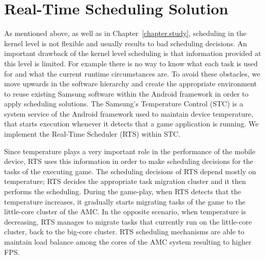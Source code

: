 \section{Real-Time Scheduling Solution}

As mentioned above, as well as in Chapter~\ref{chapter.study}, scheduling in the kernel level is not flexible and usually results to bad scheduling decisions.
An important drawback of the kernel level scheduling is that information provided at this level is limited. 
For example there is no way to know what each task is used for and what the current runtime circumstances are. 
To avoid these obstacles, we move upwards in the software hierarchy and create the appropriate environment to reuse existing Samsung software within the Android framework in order to apply scheduling solutions. 
The Samsung’s Temperature Control (STC) is a system service of the Android framework used to maintain device temperature, that starts execution whenever it detects that a game application is running.
We implement the Real-Time Scheduler (RTS) within STC.

Since temperature plays a very important role in the performance of the mobile device, RTS uses this information in order to make scheduling decisions for the tasks of the executing game.
The scheduling decisions of RTS depend mostly on temperature; RTS decides the appropriate task migration cluster and it then performs the scheduling.
During the game-play, when RTS detects that the temperature increases, it gradually starts migrating tasks of the game to the little-core cluster of the AMC.
In the opposite scenario, when temperature is decreasing, RTS manages to migrate tasks that currently run on the little-core cluster, back to the big-core cluster.
RTS scheduling mechanisms are able to maintain load balance among the cores of the AMC system resulting to higher FPS.


